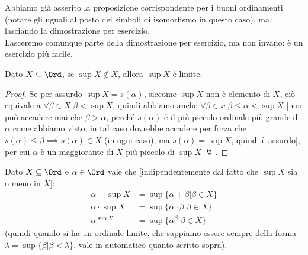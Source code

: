 \documentclass[11pt]{scrartcl}
\begin{document}
\begin{note}
	Abbiamo già asserito la proposizione corrispondente per i buoni ordinamenti (notare gli uguali al posto dei simboli di isomorfismo in questo caso), ma lasciando la dimostrazione per esercizio.\\
	Lasceremo comunque parte della dimostrazione per esercizio, ma non invano: è un esercizio più facile.
\end{note}

\begin{remark}
	Dato $X \subseteq \Ord$, se $\sup X \not \in X$, allora $\sup X$ è limite.
\end{remark}

\begin{proof}
	Se per assurdo $\sup X = s(\alpha)$, siccome $\sup X$ non è elemento di $X$, ciò equivale a $\forall \beta \in X \; \beta < \sup X$, quindi abbiamo 
	anche $\forall \beta \in x \; \beta \leq \alpha < \sup X$ [non può accadere mai che $\beta > \alpha$, perché $s(\alpha)$ è il più piccolo ordinale più grande di $\alpha$ come
	abbiamo visto, in tal caso dovrebbe accadere per forza che $s(\alpha) \leq \beta \implies s(\alpha) \in X$ (in ogni caso), ma $s(\alpha) = \sup X$, quindi è assurdo],
	per cui $\alpha$ è un maggiorante di $X$ più piccolo di $\sup X \; \lightning$.
\end{proof}

\begin{remark}
	Dato $X \subseteq \Ord$ e $\alpha \in \Ord$ vale che [indipendentemente dal fatto che $\sup X$ sia o meno in $X$]:
	\begin{align*}
		\alpha + \sup X &= \sup\{\alpha + \beta | \beta \in X\} \\
		\alpha \cdot \sup X &= \sup \{\alpha \cdot \beta | \beta \in X\} \\
		\alpha^{\sup X} &= \sup\{\alpha^\beta | \beta \in X\}
	\end{align*}
	(quindi quando si ha un ordinale limite, che sappiamo essere sempre della forma $\lambda = \sup\{\beta | \beta < \lambda\}$, vale in automatico quanto scritto sopra).
\end{remark}
\end{document}
